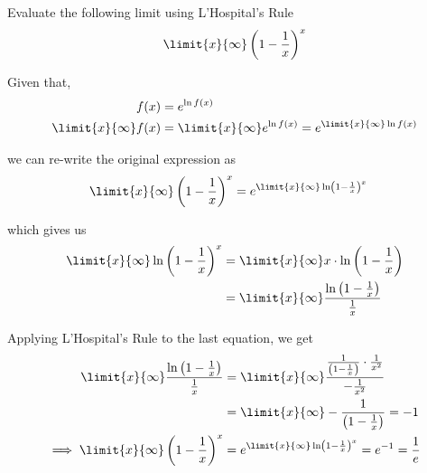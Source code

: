 

\question[4] Evaluate the following limit using L'Hospital's Rule
\[\limit{x}{\infty}\left( 1-\frac{1}{x}\right)^x\] 

\ifprintanswers
\fi 

\begin{solution}[\halfpage]
  Given that,  
  \begin{align}
    f(x) &= e^{\ln f(x)} \\
    \limit{x}{\infty} f(x) &= \limit{x}{\infty} e^{\ln f(x)} = e^{\limit{x}{\infty}\ln f(x)}
  \end{align} 

  we can re-write the original expression as 
  \begin{align}
    \limit{x}{\infty}\left( 1-\frac{1}{x} \right)^x &= e^{\limit{x}{\infty}\ln\left( 1-\frac{1}{x} \right)^x}
  \end{align}

  which gives us 
  \begin{align}
    \limit{x}{\infty}\ln\left( 1-\frac{1}{x} \right)^x &= \limit{x}{\infty}x\cdot\ln\left( 1-\frac{1}{x}\right) \\
    &= \limit{x}{\infty}\dfrac{\ln\left(1-\frac{1}{x}\right)}{\frac{1}{x}}
  \end{align}

  Applying L'Hospital's Rule to the last equation, we get 
  \begin{align}
    \limit{x}{\infty}\dfrac{\ln\left(1-\frac{1}{x}\right)}{\frac{1}{x}} 
    &= \limit{x}{\infty}\dfrac{\frac{1}{\left( 1-\frac{1}{x}\right)}\cdot\frac{1}{x^2}}{-\frac{1}{x^2}} \\
    &= \limit{x}{\infty}-\dfrac{1}{\left( 1-\frac{1}{x}\right)} = -1 \\
    \implies 
    \limit{x}{\infty}\left( 1-\frac{1}{x} \right)^x 
    &= e^{\limit{x}{\infty}\ln\left( 1-\frac{1}{x} \right)^x} = e^{-1} = \dfrac{1}{e}
  \end{align}
\end{solution}

